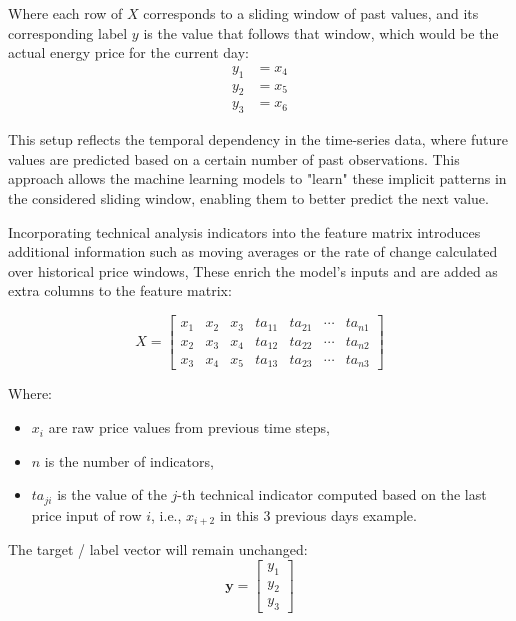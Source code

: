 \documentclass[12pt]{report} %
\begin{document}
Where each row of $\mathit{X}$ corresponds to a sliding window of past values, and its corresponding label $\mathit{y}$ is the value that follows that window, which would be the actual energy price for the current day:
\begin{align*}
y_1 &= x_4 \\
y_2 &= x_5 \\
y_3 &= x_6
\end{align*}

This setup reflects the temporal dependency in the time-series data, where future values are predicted based on a certain number of past observations. This approach allows the machine learning models to "learn" these implicit patterns in the considered sliding window, enabling them to better predict the next value.

Incorporating technical analysis indicators into the feature matrix introduces additional information such as moving averages or the rate of change calculated over historical price windows, These enrich the model’s inputs and are added as extra columns to the feature matrix:

\begin{equation*}
{X} = \begin{bmatrix}
x_1 & x_2 & x_3 & ta_{11} & ta_{21} & \cdots & ta_{n1}\\
x_2 & x_3 & x_4 & ta_{12} & ta_{22} & \cdots & ta_{n2}\\
x_3 & x_4 & x_5 & ta_{13} & ta_{23} & \cdots & ta_{n3}
\end{bmatrix}
\end{equation*}

Where:
\begin{itemize}
    \item $x_i$ are raw price values from previous time steps,
    \item $n$ is the number of indicators,
    \item $ta_{ji}$ is the value of the $j$-th technical indicator computed based on the last price input of row $i$, i.e., $x_{i+2}$ in this 3 previous days example.
\end{itemize}

The target / label vector will remain unchanged:
\begin{equation*}
\mathbf{y} = \begin{bmatrix}
y_1 \\
y_2 \\
y_3
\end{bmatrix}
\end{equation*}
\end{document}
